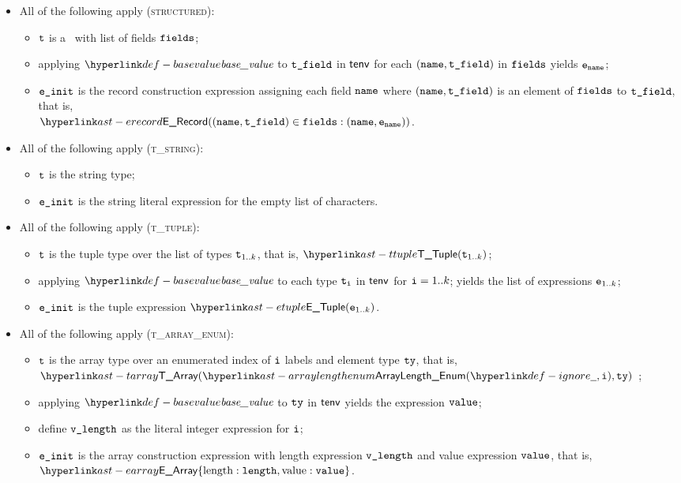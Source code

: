 \begin{itemize}
    \item All of the following apply (\textsc{structured}):
    \begin{itemize}
        \item $\texttt{t}$ is a \structuredtype\ with list of fields $\texttt{fields}$;
        \item applying $\basevalue$ to $\texttt{t\_field}$ in $\textsf{tenv}$ for each $(\texttt{name}, \texttt{t\_field})$ in $\texttt{fields}$
              yields $\texttt{e}_{\texttt{name}}$\ProseOrTypeError;
        \item $\texttt{e\_init}$ is the record construction expression assigning each field $\texttt{name}$
              where $(\texttt{name}, \texttt{t\_field})$ is an element of $\texttt{fields}$ to $\texttt{t\_field}$, that is, \\
              $\ERecord((\name, \vtefield) \in \fields: (\name, \ve_\name))$.
    \end{itemize}

    \item All of the following apply (\textsc{t\_string}):
    \begin{itemize}
        \item $\texttt{t}$ is the string type;
        \item $\texttt{e\_init}$ is the string literal expression for the empty list of characters.
    \end{itemize}

    \item All of the following apply (\textsc{t\_tuple}):
    \begin{itemize}
        \item $\texttt{t}$ is the tuple type over the list of types $\texttt{t}_{1..k}$, that is, $\TTuple(\vt_{1..k})$;
        \item applying $\basevalue$ to each type $\texttt{t}_{\texttt{i}}$ in $\textsf{tenv}$ for $\texttt{i}=1..k$; yields the list of expressions $\texttt{e}_{1..k}$;
        \item $\texttt{e\_init}$ is the tuple expression $\ETuple(\ve_{1..k})$.
    \end{itemize}

    \item All of the following apply (\textsc{t\_array\_enum}):
    \begin{itemize}
        \item $\texttt{t}$ is the array type over an enumerated index of $\texttt{i}$ labels and element type $\texttt{ty}$, that is,
              $\TArray(\ArrayLengthEnum(\Ignore, \vi), \tty)$ ;
        \item applying $\basevalue$ to $\texttt{ty}$ in $\textsf{tenv}$ yields the expression $\texttt{value}$\ProseOrTypeError;
        \item define $\texttt{v\_length}$ as the literal integer expression for $\texttt{i}$;
        \item $\texttt{e\_init}$ is the array construction expression with length expression $\texttt{v\_length}$ and value expression $\texttt{value}$,
              that is, $\EArray\{\EArrayLength: \length, \EArrayValue: \vvalue\}$.
    \end{itemize}


\end{itemize}
